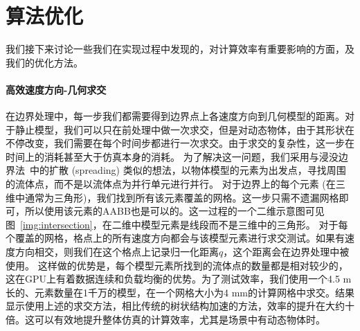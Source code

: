 \section{算法优化}
\label{sec:sig23_alg_optimal}
我们接下来讨论一些我们在实现过程中发现的，对计算效率有重要影响的方面，及我们的优化方法。

\paragraph{高效速度方向-几何求交}
在边界处理中，每一步我们都需要得到边界点上各速度方向到几何模型的距离。对于静止模型，我们可以只在前处理中做一次求交，但是对动态物体，由于其形状在不停改变，我们需要在每个时间步都进行一次求交。由于求交的复杂性，这一步在时间上的消耗甚至大于仿真本身的消耗。
为了解决这一问题，我们采用与浸没边界法~\citep{Chen-2021}中的扩散 (spreading) 类似的想法，以物体模型的元素为出发点，寻找周围的流体点，而不是以流体点为并行单元进行并行。
对于边界上的每个元素 (在三维中通常为三角形)，我们找到所有该元素覆盖的网格。这一步只需不遗漏网格即可，所以使用该元素的AABB也是可以的。这一过程的一个二维示意图可见图~\ref{img:intersection}，在二维中模型元素是线段而不是三维中的三角形。
对于每个覆盖的网格，格点上的所有速度方向都会与该模型元素进行求交测试。如果有速度方向相交，则我们在这个格点上记录归一化距离$q$，这个距离会在边界处理中被使用。
这样做的优势是，每个模型元素所找到的流体点的数量都是相对较少的，这在GPU上有着数据连续和负载均衡的优势。为了测试效率，我们使用一个4.5 m长的、元素数量在1千万的模型，在一个网格大小为4 mm的计算网格中求交。结果显示使用上述的求交方法，相比传统的树状结构加速的方法，效率的提升在大约十倍。这可以有效地提升整体仿真的计算效率，尤其是场景中有动态物体时。

